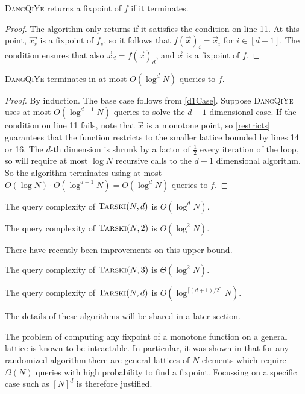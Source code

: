 \begin{lemma}
  \textsc{DangQiYe} returns a fixpoint of $f$ if it terminates.
\end{lemma}
\begin{proof}
  The algorithm only returns if it satisfies the condition on line 11. At this point, $\vec{x_s}$ is a fixpoint
  of $f_s$, so it follows that $f(\vec{x})_i = \vec{x}_i$ for $i \in [d-1]$. The condition ensures
  that also $\vec{x}_d = f(\vec{x})_d$, and $\vec{x}$ is a fixpoint of $f$.
\end{proof}
\begin{lemma}
  \textsc{DangQiYe} terminates in at most $O(\log^d N)$ queries to $f$.
\end{lemma}
\begin{proof}
  By induction. The base case follows from \cref{d1Case}. Suppose \textsc{DangQiYe} uses at most
  $O(\log^{d-1}N)$ queries to solve the $d-1$ dimensional case. If the condition
  on line 11 fails, note that $\vec{x}$ is a monotone point, so \cref{restricts} guarantees
  that the function restricts to the smaller lattice bounded by lines 14 or 16.
  The $d$-th dimension is shrunk by a factor of $\frac{1}{2}$ every iteration of the loop,
  so will require at most $\log N$ recursive calls to the $d-1$ dimensional algorithm.
  So the algorithm terminates using at most $O(\log N) \cdot O(\log^{d-1} N) = O(\log^d N)$ queries to $f$.
\end{proof}
\begin{theorem}
  The query complexity of $\textsc{Tarski}(N, d)$ is $O(\log^d N)$.
\end{theorem}
\begin{cor}
  The query complexity of $\textsc{Tarski}(N, 2)$ is $\Theta(\log^2 N)$.
\end{cor}
There have recently been improvements on this upper bound.
\begin{theorem}
  The query complexity of $\textsc{Tarski}(N, 3)$ is $\Theta(\log^2 N)$.
\end{theorem}
\begin{theorem}
  The query complexity of $\textsc{Tarski}(N, d)$ is $O(\log^{\lceil (d+1)/2 \rceil} N)$.
\end{theorem}
The details of these algorithms will be shared in a later section.
\begin{remark}
  The problem of computing any fixpoint of a monotone function on a general lattice
  is known to be intractable. In particular, it was shown in \citep{changComplexity}
  that for any randomized algorithm there are general lattices of $N$ elements 
  which require $\Omega(N)$ queries with high probability to find a fixpoint.
  Focussing on a specific case such as $[N]^d$ is therefore justified.
\end{remark}

